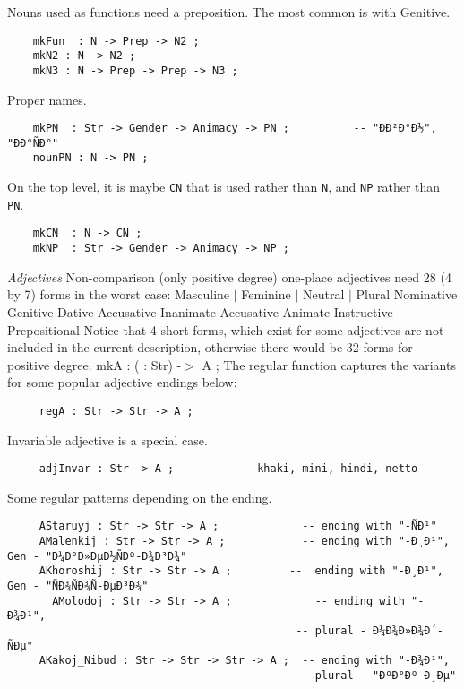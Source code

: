 \documentclass[11pt,a4paper]{article}
\newcommand{\subsubsubsection}[1]{\textit{#1}}
\begin{document}
Nouns used as functions need a preposition. The most common is with Genitive.

\begin{verbatim}
    mkFun  : N -> Prep -> N2 ;
    mkN2 : N -> N2 ;
    mkN3 : N -> Prep -> Prep -> N3 ;
\end{verbatim}

Proper names.

\begin{verbatim}
    mkPN  : Str -> Gender -> Animacy -> PN ;          -- "ÐÐ²Ð°Ð½", "ÐÐ°ÑÐ°"
    nounPN : N -> PN ;
\end{verbatim}

On the top level, it is maybe \texttt{CN} that is used rather than \texttt{N}, and
\texttt{NP} rather than \texttt{PN}.

\begin{verbatim}
    mkCN  : N -> CN ;
    mkNP  : Str -> Gender -> Animacy -> NP ;
\end{verbatim}

\subsubsubsection{Adjectives}
Non-comparison (only positive degree) one-place adjectives need 28 (4 by 7)
forms in the worst case:
Masculine  $|$ Feminine $|$ Neutral $|$ Plural
Nominative
Genitive
Dative
Accusative Inanimate
Accusative Animate
Instructive
Prepositional
Notice that 4 short forms, which exist for some adjectives are not included 
in the current description, otherwise there would be 32 forms for 
positive degree.
mkA : ( : Str) -$>$ A ;
The regular function captures the variants for some popular adjective
endings below:

\begin{verbatim}
     regA : Str -> Str -> A ;
\end{verbatim}

Invariable adjective is a special case.

\begin{verbatim}
     adjInvar : Str -> A ;          -- khaki, mini, hindi, netto
\end{verbatim}

Some regular patterns depending on the ending.

\begin{verbatim}
     AStaruyj : Str -> Str -> A ;             -- ending with "-ÑÐ¹"
     AMalenkij : Str -> Str -> A ;            -- ending with "-Ð¸Ð¹", Gen - "Ð¼Ð°Ð»ÐµÐ½ÑÐº-Ð¾Ð³Ð¾"
     AKhoroshij : Str -> Str -> A ;         --  ending with "-Ð¸Ð¹", Gen - "ÑÐ¾ÑÐ¾Ñ-ÐµÐ³Ð¾"
       AMolodoj : Str -> Str -> A ;             -- ending with "-Ð¾Ð¹", 
                                             -- plural - Ð¼Ð¾Ð»Ð¾Ð´-ÑÐµ"
     AKakoj_Nibud : Str -> Str -> Str -> A ;  -- ending with "-Ð¾Ð¹", 
                                             -- plural - "ÐºÐ°Ðº-Ð¸Ðµ"
\end{verbatim}
\end{document}
